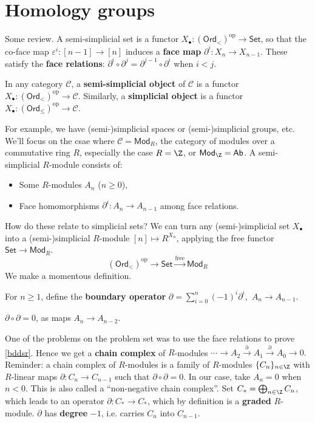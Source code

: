 \section{Homology groups} 
Some review. A semi-simplicial set is a functor $X _{\bullet}\colon (\mathsf{Ord} _<)^{\mathrm{op}} \to \mathsf{Set} $, so that the co-face map $\varepsilon ^i  \colon [n-1] \to [n]$ induces a \textbf{face map} $\partial ^i \colon X_n  \to X_{n-1}$. These satisfy the \textbf{face relations}: $\partial ^i  \circ \partial ^j  = \partial ^{j-1}\circ \partial ^i $ when $i<j$.

\begin{definition}[]
    In any category $\mathcal{C} $, a \textbf{semi-simplicial object} of $\mathcal{C} $ is a functor $X_{\bullet} \colon (\mathsf{Ord} _<)^{\mathrm{op}} \to \mathcal{C} $. Similarly, a \textbf{simplicial object} is a functor $X_{\bullet}\colon  (\mathsf{Ord} _{\leq}) ^{\mathrm{op}} \to \mathcal{C} $. 
\end{definition}For example, we have (semi-)simplicial spaces or (semi-)simplicial groups, etc. We'll focus on the csae where $\mathcal{C} = \mathsf{Mod}_R$, the category of modules over a commutative ring $R$, especially the case $R=\Z$, or $\mathsf{Mod} _{\Z}=\mathsf{Ab} $. A semi-simplicial $R$-module consists of:
\begin{itemize}
\setlength\itemsep{-.2em}
    \item Some $R$-modules $A_n $ ($n\geq 0$),
    \item Face homomorphisms $\partial ^i  \colon A_n  \to A_{n-1}$ among face relations.
\end{itemize}
How do these relate to simplicial sets? We can turn any (semi-)simplicial set $X_{\bullet}$ into a (semi-)simplicial $R$-module $[n] \mapsto R^{X_n }$, applying the free functor $\mathsf{Set} \to  \mathsf{Mod} _R$. \[
    (\mathsf{Ord} _<)^{\mathrm{op}}\to  \mathsf{Set} \xrightarrow{\text{free} } \mathsf{Mod} _R
\] We make a momentous definition.
\begin{definition}
    For $n\geq 1$, define the \textbf{boundary operator} $\partial =\sum _{i=0}^n    (-1)^i  \partial ^i $,\ $A_n  \to A_{n-1}$.
\end{definition}
\begin{lemma}\label{bddsr} 
    $\partial \circ \partial =0$, as maps $A_n \to A_{n-2}$.
\end{lemma}
One of the problems on the problem set was to use the face relations to prove \cref{bddsr}. Hence we get a \textbf{chain complex} of $R$-modules $\cdots  \to A_2 \xrightarrow{\partial } A_1 \xrightarrow{\partial } A_0 \to 0.$ Reminder: a chain complex of $R$-modules is a family of $R$-modules $\{C_n \} _{n \in \Z}$ with $R$-linear maps $\partial  \colon C_n  \to C_{n-1}$ such that $\partial \circ \partial =0$. In our case, take $A_n =0$ when $n<0$. This is also called a ``non-negative chain complex''. Set $C_*= \bigoplus _{n \in \Z}C_n $, which leads to an operator $\partial  \colon C_* \to C_*$, which by definition is a \textbf{graded} $R$-module. $\partial $ has \textbf{degree} $-1$, i.e. carries $C_n $ into $C_{n-1}$. 

